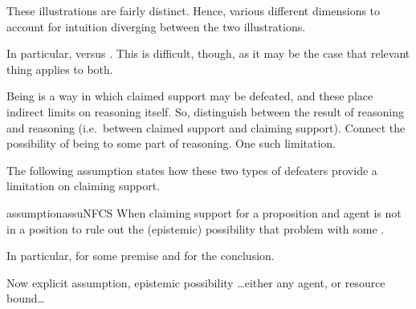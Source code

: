 \begin{note}
  These illustrations are fairly distinct.
  Hence, various different dimensions to account for intuition diverging between the two illustrations.

  In particular, \mistaken{} versus \misled{}.
  This is difficult, though, as it may be the case that relevant thing applies to both.

  Being \mom{} is a way in which claimed support may be defeated, and these place indirect limits on reasoning itself.
  So, distinguish between the result of reasoning and reasoning (i.e.\ between claimed support and claiming support).
  Connect the possibility of being \mom{} to some part of reasoning.
  One such limitation.
\end{note}

\begin{note}
  The following assumption states how these two types of defeaters provide a limitation on claiming support.

  \begin{restatable}[\nfcs{--} -- \nfcs{}]{assumption}{assuNFCS}\label{assu:supp:nfactive}
    When claiming support for a proposition and agent is not in a position to rule out the (epistemic) possibility that problem with some \requ{}.

    In particular, for some premise and for the conclusion.
  \end{restatable}

  Now explicit assumption, epistemic possibility \dots either any agent, or resource bound\dots
\end{note}

